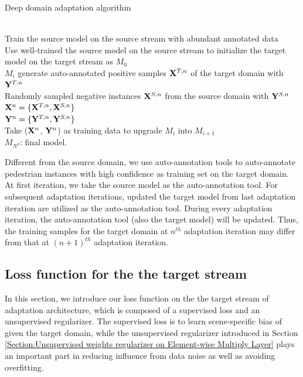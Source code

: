 \documentclass[runningheads]{llncs}
\begin{document}
\begin{algorithm}
\caption{Deep domain adaptation algorithm}
\label{algorithm:Deep domain adaptation algorithm}
\begin{algorithmic}[1]
 {} \\
\indent Train the source model on the source stream with abundant annotated data \\
\indent Use well-trained the source model on the source stream to initialize the target model on the target stream as $M_{0}$
 \\
\indent \indent $M_{i}$ generate auto-annotated positive samples ${\bf X}^{T,n}$ of the target domain with ${\bf Y}^{T,n}$\\
\indent \indent Randomly sampled negative instances ${\bf X}^{S,n}$ from the source domain with ${\bf Y}^{S,n}$\\
\indent \indent ${\bf X}^{n} = \{{\bf X}^{T,n}, {\bf X}^{S,n}\}$ \\
\indent \indent ${\bf Y}^{n} = \{{\bf Y}^{T,n}, {\bf Y}^{S,n}\}$ \\
\indent \indent Take (${\bf X}^{n}$, ${\bf Y}^{n}$) as training data to upgrade $M_{i}$ into $M_{i+1}$
\EndFor \\
\indent $M_{N^{I}}$: final model.
\EndProcedure
\end{algorithmic}
\end{algorithm}

Different from the source domain, we use auto-annotation tools to auto-annotate pedestrian instances with high confidence as training set on the target domain. At first iteration, we take the source model as the auto-annotation tool. For subsequent adaptation iterations, updated the target model from last adaptation iteration are utilized as the auto-annotation tool. During every adaptation iteration, the auto-annotation tool (also the target model) will be updated. Thus, the training samples for the target domain at $n^{th}$ adaptation iteration may differ from that at $(n+1)^{th}$ adaptation iteration.

\subsection{Loss function for the the target stream}
\label{Section:Loss function for the the target stream}

In this section, we introduce our loss function on the the target stream of adaptation architecture, which is composed of a supervised loss and an unsupervised regularizer. The supervised loss is to learn scene-specific bias of given the target domain, while the unsupervised regularizer introduced in Section \ref{Section:Unsupervised weights regularizer on Element-wise Multiply Layer} plays an important part in reducing influence from data noise as well as avoiding overfitting.
\end{document}
